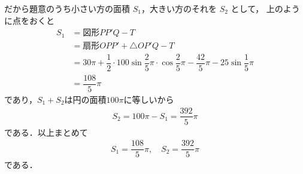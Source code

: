 \documentclass[../../main.tex]{subfiles}
\begin{document}
だから題意のうち小さい方の面積 $S_1$，大きい方のそれを $S_2$ として，
上のように点をおくと
\begin{align}
  S_1
  &= \text{図形}PP'Q - T \\
  &= \text{扇形}OPP'+\triangle OP'Q - T \\
  &= 30\pi + \dfrac{1}{2} \cdot 100 \sin\dfrac{2}{5}\pi \cdot \cos\dfrac{2}{5}\pi - \dfrac{42}{5}\pi - 25\sin\dfrac{1}{5}\pi \\
  &= \dfrac{108}{5}\pi
\end{align}
であり，$S_1+S_2$は円の面積$100\pi$に等しいから
\begin{align}
  S_2 = 100\pi - S_1 = \dfrac{392}{5}\pi
\end{align}
である．以上まとめて
\begin{align}
  S_1 = \dfrac{108}{5}\pi, \quad S_2 = \dfrac{392}{5}\pi
\end{align}
である．
\end{document}
